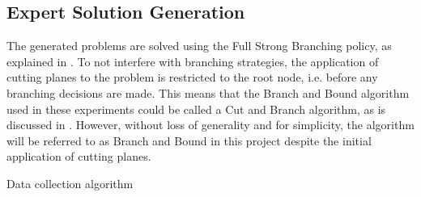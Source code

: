 







\subsection{Expert Solution Generation}\label{ssec:expertsolutiongeneration}

The generated problems are solved using the Full Strong Branching policy, as explained in . To not interfere with branching strategies, the application of cutting planes to the problem is restricted to the root node, i.e. before any branching decisions are made. This means that the Branch and Bound algorithm used in these experiments could be called a Cut and Branch algorithm, as is discussed in .
However, without loss of generality and for simplicity, the algorithm will be referred to as Branch and Bound in this project despite the initial application of cutting planes.  


\begin{algorithm}[H]
    \SetAlgoLined
    
    \caption{\label{alg:datacol} Data collection algorithm}
\end{algorithm}



